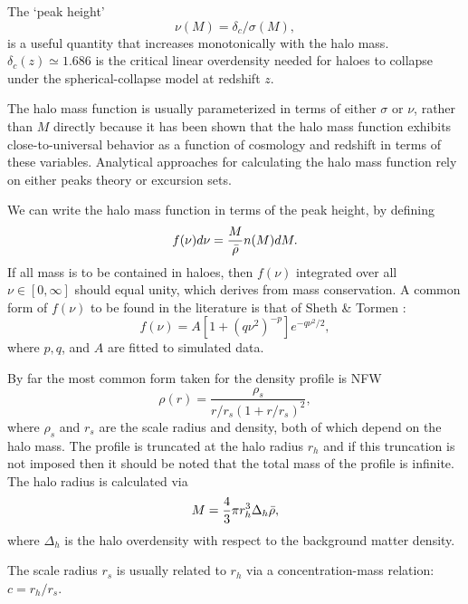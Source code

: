 The `peak height' 
\begin{equation}
    \nu(M) = \delta_c / \sigma(M),
\end{equation}
is a useful quantity that increases monotonically with the halo mass. $\delta_c(z) \simeq 1.686$ is the critical linear overdensity needed for haloes to collapse under the spherical-collapse model at redshift $z$.

The halo mass function is usually parameterized in terms of either $\sigma$ or $\nu$, rather than $M$ directly because it has been shown that the halo mass function exhibits close-to-universal behavior as a function of cosmology and redshift in terms of these variables. Analytical approaches for calculating the halo mass function rely on either peaks theory or excursion sets. 

We can write the halo mass function in terms of the peak height, by defining
\begin{equation}
    f(\nu) d\nu = \frac{M}{\Bar{\rho}} n(M) dM.
\end{equation}
If all mass is to be contained in haloes, then $f(\nu)$ integrated over all $\nu \in [0, \infty]$ should equal unity, which derives from mass conservation. A common form of $f(\nu)$ to be found in the literature is that of Sheth \& Tormen \cite{Sheth_1999}:
\begin{equation}
    f(\nu) = A[1 + (q \nu^2)^{-p}] e^{- q\nu^2/2},
\end{equation}
where $p, q$, and $A$ are fitted to simulated data. 

By far the most common form taken for the density profile is NFW
\begin{equation}
    \rho(r) = \frac{\rho_s}{r/r_s(1+r/r_s)^2},
\end{equation}
where $\rho_s$ and $r_s$ are the scale radius and density, both of which depend on the halo mass. The profile is truncated at the halo radius $r_h$ and if this truncation is not imposed then it should be noted that the total mass of the profile is infinite. The halo radius is calculated via
\begin{equation}
    M = \frac{4}{3}\pi r_h^3 \Delta_h \Bar{\rho},
\end{equation}
where $\Delta_h$ is the halo overdensity with respect to the background matter density.

The scale radius $r_s$ is usually related to $r_h$ via a concentration-mass relation: $c = r_h / r_s$.